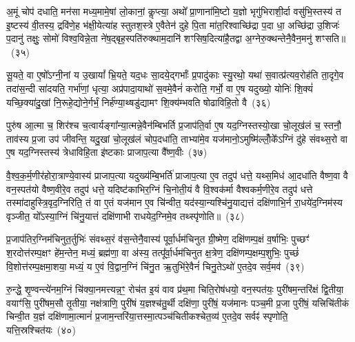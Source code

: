 अ॒मूं चोप॑ दधाति॒ मन॑सा मध्य॒मामे॒षां लो॒कानां॒ कॢप्त्या॒ अथो᳚ प्रा॒णाना॑मि॒ष्टो य॒ज्ञो भृगु॑भिराशी॒र्दा वसु॑भि॒स्तस्य॑ त इ॒ष्टस्य॑ वी॒तस्य॒ द्रवि॑णे॒ह भ॑क्षी॒येत्या॑ह स्तुतश॒स्त्रे ए॒वैतेन॑ दुहे पि॒ता मा॑त॒रिश्वाच्छि॑द्रा प॒दा धा॒ अच्छि॑द्रा उ॒शिजः॑ प॒दानु॑ तक्षुः॒ सोमो॑ विश्व॒विन्ने॒ता ने॑ष॒द्बृह॒स्पति॑रुक्थाम॒दानि॑ शꣳसिष॒दित्या॑है॒तद्वा अ॒ग्नेरु॒क्थन्तेनै॒वैन॒मनु॑ शꣳसति॥~(३५)

{\anuvakamend[{मि॒नु॒यात्तृ॒तीयं॑ चिन्वा॒नस्त्रियं॒ पौत्र॑श्च॒ वै स॒प्तद॑श च}]}%

सू॒यते॒ वा ए॒षो᳚\-ऽग्नी॒नां य उ॒खायां᳚ भ्रि॒यते॒ यद॒धः सा॒दये॒द्गर्भाः᳚ प्र॒पादु॑काः स्यु॒रथो॒ यथा॑ स॒वात्प्र॑त्यव॒रोह॑ति ता॒दृगे॒व तदा॑स॒न्दी सा॑दयति॒ गर्भा॑णां॒ धृत्या॒ अप्र॑पादा॒याथो॑ स॒वमे॒वैनं॑ करोति॒ गर्भो॒ वा ए॒ष यदुख्यो॒ योनिः॑ शि॒क्यं॑ यच्छि॒क्या॑दु॒खां नि॒रूहे॒द्योने॒र्गर्भं॒ निर्\mbox{}ह॑ण्या॒थ्षडु॑द्यामꣳ शि॒क्य॑म्भवति षोढाविहि॒तो वै~(३६)

पुरु॑ष आ॒त्मा च॒ शिर॑श्च च॒त्वार्यङ्गा᳚न्या॒त्मन्ने॒वैन॑म्बिभर्ति प्र॒जाप॑ति॒र्वा ए॒ष यद॒ग्निस्तस्यो॒खा चो॒लूख॑लं च॒ स्तनौ॒ ताव॑स्य प्र॒जा उप॑ जीवन्ति॒ यदु॒खां चो॒लूख॑लं चोप॒दधा॑ति॒ ताभ्या॑मे॒व यज॑मानो॒\-ऽमुष्मि॑ल्लोँ॒के᳚\-ऽग्निं दु॑हे संवथ्स॒रो वा ए॒ष यद॒ग्निस्तस्य॑ त्रेधाविहि॒ता इ॑ष्टकाः प्राजाप॒त्या वै᳚ष्ण॒वीः~(३७)

वै॒श्व॒क॒र्म॒णीर॑होरा॒त्राण्ये॒वास्य॑ प्राजाप॒त्या यदुख्य॑म्बि॒भर्ति॑ प्राजाप॒त्या ए॒व तदुप॑ धत्ते॒ यथ्स॒मिध॑ आ॒दधा॑ति वैष्ण॒वा वै वन॒स्पत॑यो वैष्ण॒वीरे॒व तदुप॑ धत्ते॒ यदिष्ट॑काभिर॒ग्निं चि॒नोती॒यं वै वि॒श्वक॑र्मा वैश्वकर्म॒णीरे॒व तदुप॑ धत्ते तस्मा॑दाहुस्त्रि॒वृद॒ग्निरिति॒ तं वा ए॒तं यज॑मान ए॒व चि॑न्वीत॒ यद॑स्या॒न्यश्चि॑नु॒याद्यत्तं दक्षि॑णाभि॒र्न रा॒धये॑द॒ग्निम॑स्य वृञ्जीत॒ यो᳚\-ऽस्या॒ग्निं चि॑नु॒यात्तं दक्षि॑णाभी राधयेद॒ग्निमे॒व तथ्स्पृ॑णोति॥~(३८)

{\anuvakamend[{षो॒ढा॒वि॒हि॒तो वै वै᳚ष्ण॒वीर॒न्यो विꣳ॑श॒तिश्च॑}]}%

प्र॒जाप॑तिर॒ग्निम॑चिनुत॒र्तुभिः॑ संवथ्स॒रं व॑स॒न्तेनै॒वास्य॑ पूर्वा॒र्धम॑चिनुत ग्री॒ष्मेण॒ दक्षि॑णम्प॒क्षं व॒र्\mbox{}षाभिः॒ पुच्छꣳ॑ श॒रदोत्त॑रम्प॒क्षꣳ हे॑म॒न्तेन॒ मध्यं॒ ब्रह्म॑णा॒ वा अ॑स्य॒ तत्पू᳚र्वा॒र्धम॑चिनुत क्ष॒त्रेण॒ दक्षि॑णम्प॒क्षम्प॒शुभिः॒ पुच्छं॑ वि॒शोत्त॑रम्प॒क्षमा॒शया॒ मध्यं॒ य ए॒वं वि॒द्वान॒ग्निं चि॑नु॒त ऋ॒तुभि॑रे॒वैनं॑ चिनु॒ते\-ऽथो॑ ए॒तदे॒व सर्व॒मव॑~(३९)

रु॒न्द्धे॒ शृ॒ण्वन्त्ये॑नम॒ग्निं चि॑क्या॒नमत्त्यन्न॒ꣳ॒ रोच॑त इ॒यं वाव प्र॑थ॒मा चिति॒रोष॑धयो॒ वन॒स्पत॑यः॒ पुरी॑षम॒न्तरि॑क्षं द्वि॒तीया॒ वयाꣳ॑सि॒ पुरी॑षम॒सौ तृ॒तीया॒ नक्ष॑त्राणि॒ पुरी॑षं य॒ज्ञश्च॑तु॒र्थी दक्षि॑णा॒ पुरी॑षं॒ यज॑मानः पञ्च॒मी प्र॒जा पुरी॑षं॒ यत्त्रिचि॑तीकं चिन्वी॒त य॒ज्ञं दक्षि॑णामा॒त्मानं॑ प्र॒जाम॒न्तरि॑या॒त्तस्मा॒त्पञ्च॑चितीकश्चेत॒व्य॑ ए॒तदे॒व सर्वꣴ॑ स्पृणोति॒ यत्ति॒स्रश्चित॑यः~(४०)

